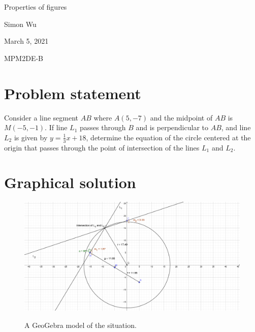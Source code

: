 \documentclass[12pt]{article}
\begin{document}
\begin{titlepage}

\begin{center}
    \Huge{Properties of figures}
    
    \vspace{1in}
    
    \Large{Simon Wu}
    
    \Large{March 5, 2021}
    
    \vspace{1in}
    
    \Large{MPM2DE-B}

    
\end{center}

\tableofcontents

\end{titlepage}

\section{Problem statement}

\begin{displayquote}

Consider a line segment $AB$ where $A(5, -7)$ and the midpoint of $AB$ is $M(-5, -1)$. If line $L_1$ passes through $B$ and is perpendicular to $AB$, and line $L_2$ is given by $y = \frac{1}{3}x + 18$, determine the equation of the circle centered at the origin that passes through the point of intersection of the lines $L_1$ and $L_2$.

\end{displayquote}

\section{Graphical solution}

\begin{figure}[h]
\caption{A GeoGebra model of the situation.}
\includegraphics[width=6.5in]{circle2}
\label{fig:geogebra}
\end{figure}
\end{document}
